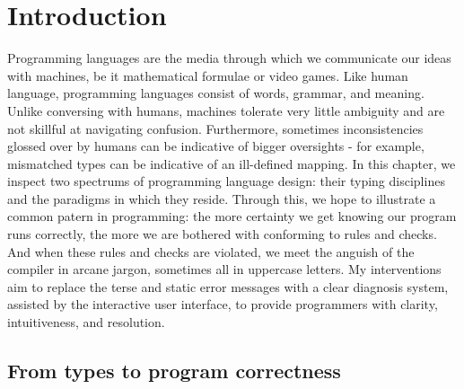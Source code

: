 
\chapter{Introduction}

\label{chap:introduction} 

\graphicspath{{Figures/Introduction}}

Programming languages are the media through which we communicate our ideas with machines, be it mathematical formulae or video games. Like human language, programming languages consist of words, grammar, and meaning. Unlike conversing with humans, machines tolerate very little ambiguity and are not skillful at navigating confusion. Furthermore, sometimes inconsistencies glossed over by humans can be indicative of bigger oversights - for example, mismatched types can be indicative of an ill-defined mapping. In this chapter, we inspect two spectrums of programming language design: their typing disciplines and the paradigms in which they reside. Through this, we hope to illustrate a common patern in programming: the more certainty we get knowing our program runs correctly, the more we are bothered with conforming to rules and checks. And when these rules and checks are violated, we meet the anguish of the compiler in arcane jargon, sometimes all in uppercase letters. My interventions aim to replace the terse and static error messages with a clear diagnosis system, assisted by the interactive user interface, to provide programmers with clarity, intuitiveness, and resolution.   



\section{From types to program correctness}

